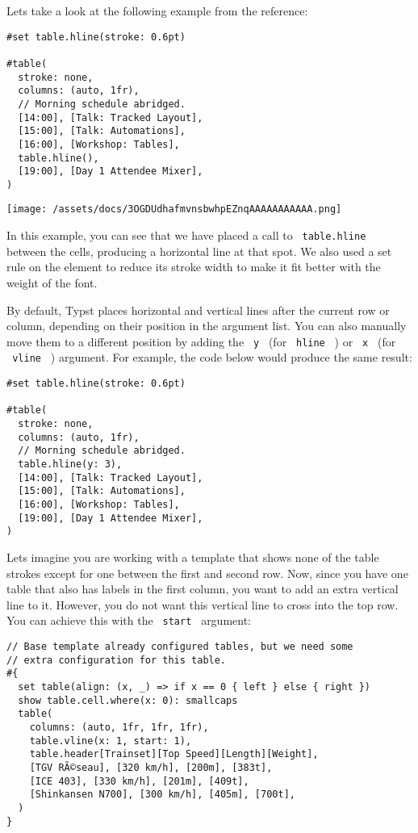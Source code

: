 Let\textquotesingle s take a look at the following example from the
reference:

\begin{verbatim}
#set table.hline(stroke: 0.6pt)

#table(
  stroke: none,
  columns: (auto, 1fr),
  // Morning schedule abridged.
  [14:00], [Talk: Tracked Layout],
  [15:00], [Talk: Automations],
  [16:00], [Workshop: Tables],
  table.hline(),
  [19:00], [Day 1 Attendee Mixer],
)
\end{verbatim}

\texttt{[image: /assets/docs/3OGDUdhafmvnsbwhpEZnqAAAAAAAAAAA.png]}

In this example, you can see that we have placed a call to
\texttt{\ table.hline\ } between the cells, producing a horizontal line
at that spot. We also used a set rule on the element to reduce its
stroke width to make it fit better with the weight of the font.

By default, Typst places horizontal and vertical lines after the current
row or column, depending on their position in the argument list. You can
also manually move them to a different position by adding the
\texttt{\ y\ } (for \texttt{\ hline\ } ) or \texttt{\ x\ } (for
\texttt{\ vline\ } ) argument. For example, the code below would produce
the same result:

\begin{verbatim}
#set table.hline(stroke: 0.6pt)

#table(
  stroke: none,
  columns: (auto, 1fr),
  // Morning schedule abridged.
  table.hline(y: 3),
  [14:00], [Talk: Tracked Layout],
  [15:00], [Talk: Automations],
  [16:00], [Workshop: Tables],
  [19:00], [Day 1 Attendee Mixer],
)
\end{verbatim}

Let\textquotesingle s imagine you are working with a template that shows
none of the table strokes except for one between the first and second
row. Now, since you have one table that also has labels in the first
column, you want to add an extra vertical line to it. However, you do
not want this vertical line to cross into the top row. You can achieve
this with the \texttt{\ start\ } argument:

\begin{verbatim}
// Base template already configured tables, but we need some
// extra configuration for this table.
#{
  set table(align: (x, _) => if x == 0 { left } else { right })
  show table.cell.where(x: 0): smallcaps
  table(
    columns: (auto, 1fr, 1fr, 1fr),
    table.vline(x: 1, start: 1),
    table.header[Trainset][Top Speed][Length][Weight],
    [TGV RÃ©seau], [320 km/h], [200m], [383t],
    [ICE 403], [330 km/h], [201m], [409t],
    [Shinkansen N700], [300 km/h], [405m], [700t],
  )
}
\end{verbatim}

